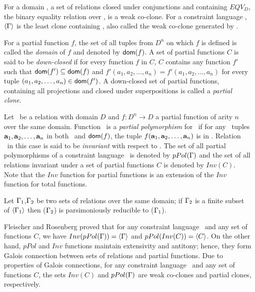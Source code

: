 For a domain \mD, a set of relations closed under conjunctions and
containing \(EQV_D\), the binary equality relation over \mD,
is a weak co-clone. For a constraint language \mrelset, 
\(\langle \Gamma \rangle\) is the least clone containing \mrelset,
also called the weak co-clone generated by \mrelset\@.

For a partial function \(f\), the set of all tuples from \(D^n\) on which \(f\) is
defined is called the \emph{domain} of \(f\) and denoted by \({\sf dom}(f)\).
A set of partial functions \(C\) is said to be \emph{down-closed} if
for every function \(f\) in \(C\), \(C\) contains any function \(f'\) such that \({\sf dom}(f')\subseteq{\sf dom}(f)\) and \(f'(a_1,a_2,\dotsc,a_n)=f'(a_1,a_2,\dotsc,a_n)\)
for every tuple \((a_1,a_2,\dotsc,a_n)\in {\sf dom}(f')\)\@.
A down-closed set of partial functions, 
containing all projections and closed under 
superpositions is called a \emph{partial clone}. 

Let \mR\ be a relation with domain \(D\) and \(f:D^n\to D\) a partial function of arity \(n\)
over the same domain.
Function \mf\ is a \emph{partial polymorphism} for \mR\ if
for any \mn\ tuples \(\textbf{a}_1,\textbf{a}_2,\dotsc,\textbf{a}_n\) in both \mR\ and \({\sf dom}(f)\), the tuple
\(f(\textbf{a}_1,\textbf{a}_2,\dotsc,\textbf{a}_n)\) is in \mR\@. Relation \mR\ in this case is said to be \emph{invariant} with respect to \mf\@.
The set of all partial polymorphisms of a constraint language \mrelset\ is denoted by
\(pPol(\Gamma)\) and the set of all relations invariant under a set of partial functions
\(C\) is denoted by \(Inv(C)\)\@. Note that the \(Inv\) function for partial functions is
an extension of the \(Inv\) function for total functions.

\begin{theorem}  \label{trm:partial}
Let \(\Gamma_1\),\(\Gamma_2\) be two sets of relations over the same domain; if 
\(\Gamma_2\) is a finite subset of \(\langle \Gamma_1 \rangle\) then
\ccsp(\(\Gamma_2\)) is parsimoniously reducible to \ccsp(\(\Gamma_1\))\@.
\end{theorem}

Fleischer and Rosenberg \cite{Rosenberg} proved that for any constraint language \mrelset\
and any set of functions \(C\),
we have \(Inv(pPol(\Gamma))=\langle \Gamma \rangle\) and
\(pPol(Inv(C))=\langle C \rangle\)\@. On the other hand, \(pPol\) and \(Inv\) functions 
maintain extensivity and antitony; hence, they form Galois connection between 
sets of relations and partial functions. Due to properties of Galois connections,
for any constraint language \mrelset\ and any set of functions \(C\), the 
sets \(Inv(C)\) and \(pPol(\Gamma)\) are weak co-clones and partial clones, respectively.

